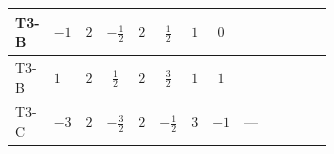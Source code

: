 \documentclass[8pt]{article}
\begin{document}
\begin{landscape}
\begin{longtable}{@{}llcccccc >{\raggedright\arraybackslash}p{0.21\linewidth} >{\raggedright\arraybackslash}p{0.21\linewidth} >{\raggedright\arraybackslash}p{0.21\linewidth}@{}}
\midrule
T3-B & $-1$ & $2$ & $-\frac{1}{2}$ & $2$ & $\frac{1}{2}$ & $1$ & $0$ & \scriptsize\adjustbox{max width=\linewidth}{$\begin{gathered} {\lambda_{HS_1}^{(A)}} (2 T_{\nu}^{(1)}+6 \operatorname{Tr}\!\left({Y_d}\,\left({Y_d}\right)^{\dagger}\right)+2 \operatorname{Tr}\!\left({Y_e}\,\left({Y_e}\right)^{\dagger}\right)+6 \operatorname{Tr}\!\left({Y_u}\,\left({Y_u}\right)^{\dagger}\right))\end{gathered}$} & \scriptsize\adjustbox{max width=\linewidth}{$\begin{gathered} +\frac{8}{3} \operatorname{Tr}\!\left({y_1}\,\left({y_1}\right)^{\dagger}\,{Y_e}\,\left({Y_e}\right)^{\dagger}\right)\end{gathered}$} & \scriptsize\adjustbox{max width=\linewidth}{$\begin{gathered} +\frac{16}{3} {\lambda_5} \left({\lambda_5}\right)^{*}\end{gathered}$} \\
\midrule
T3-B & $1$ & $2$ & $\frac{1}{2}$ & $2$ & $\frac{3}{2}$ & $1$ & $1$ & \scriptsize\adjustbox{max width=\linewidth}{$\begin{gathered} {\lambda_{HS_1}^{(A)}} (2 T_{\nu}^{(1)}+6 \operatorname{Tr}\!\left({Y_d}\,\left({Y_d}\right)^{\dagger}\right)+2 \operatorname{Tr}\!\left({Y_e}\,\left({Y_e}\right)^{\dagger}\right)+6 \operatorname{Tr}\!\left({Y_u}\,\left({Y_u}\right)^{\dagger}\right))\end{gathered}$} & \scriptsize\adjustbox{max width=\linewidth}{$\begin{gathered} +\frac{8}{3} \operatorname{Tr}\!\left({y_1}\,\left({y_1}\right)^{\dagger}\,{Y_e}\,\left({Y_e}\right)^{\dagger}\right)\end{gathered}$} & \scriptsize\adjustbox{max width=\linewidth}{$\begin{gathered} +\frac{16}{3} {\lambda_5} \left({\lambda_5}\right)^{*}\end{gathered}$} \\
\midrule
T3-C & $-3$ & $2$ & $-\frac{3}{2}$ & $2$ & $-\frac{1}{2}$ & $3$ & $-1$ & --- & \scriptsize\adjustbox{max width=\linewidth}{$\begin{gathered} -\frac{4}{3} \operatorname{Tr}\!\left({y_1}\,\left({y_1}\right)^{\dagger}\,{Y_e}\,\left({Y_e}\right)^{\dagger}\right)\end{gathered}$} & \scriptsize\adjustbox{max width=\linewidth}{$\begin{gathered} +\frac{16}{3} {\lambda_5} \left({\lambda_5}\right)^{*}\end{gathered}$} \\

\end{longtable}
\end{landscape}
\end{document}

